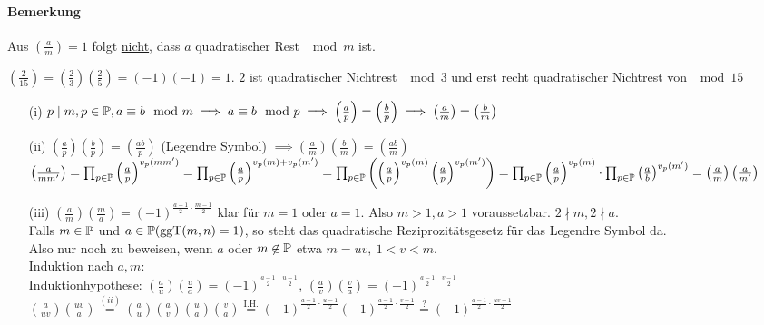 \documentclass[a4paper,twoside,DIV15,BCOR12mm]{scrbook}
\begin{document}
\paragraph{Bemerkung}
Aus $\left(\frac{a}{m}\right) = 1$ folgt \underline{nicht}, dass $a$ quadratischer Rest $\mod m$ ist.\\
\begin{beispiel}
    $\left(\frac{2}{15}\right) = \left(\frac{2}{3}\right)\left(\frac{2}{5}\right) = (-1)(-1) =
    1$.
    $2$ ist quadratischer Nichtrest $\mod 3$ und erst recht quadratischer Nichtrest von $\mod 15$
\end{beispiel}

\begin{beweis}
    \begin{itemize}
        \item[(i)] $p \mid m, p \in \mathbb{P}, a \equiv b \mod m \implies a \equiv b \mod p \implies
        \left(\frac{a}{p}\right) = \left(\frac{b}{p}\right) \implies \left(\frac{a}{m}\right) = \left(\frac{b}{m}\right)$
        \item[(ii)] $\left(\frac{a}{p}\right)\left(\frac{b}{p}\right) = \left(\frac{ab}{p}\right)$
        (Legendre Symbol) $\implies \left(\frac{a}{m}\right)\left(\frac{b}{m}\right) = \left(\frac{ab}{m}\right)$\\
            $\left(\frac{a}{mm'}\right) = \prod_{p \in \mathbb{P}}\left(\frac{a}{p}\right)^{v_p(mm')} =
            \prod_{p \in \mathbb{P}}\left(\frac{a}{p}\right)^{v_p(m) + v_p(m')} = \prod_{p \in \mathbb{P}}\left(\left(\frac{a}{p}\right)^{v_p(m)}\left(\frac{a}{p}\right)^{v_p(m')}\right)
            = \prod_{p \in \mathbb{P}}\left(\frac{a}{p}\right)^{v_p(m)} \cdot \prod_{p \in \mathbb{P}}\left(\frac{a}{b}\right)^{v_p(m')}
            = \left(\frac{a}{m}\right)\left(\frac{a}{m'}\right)$
        \item[(iii)] $\left(\frac{a}{m}\right)\left(\frac{m}{a}\right) = (-1)^{\frac{a-1}{2} \cdot \frac{m-1}{2}}$ klar für $m = 1$ oder $a = 1$. Also $m > 1, a > 1$ voraussetzbar. $2 \nmid m, 2 \nmid a$.\\
        Falls $m \in \mathbb{P}$ und $a \in \mathbb{P} (\mathop{\rm ggT}\nolimits (m, n) = 1)$, so steht das quadratische Reziprozitätsgesetz für das Legendre Symbol da.\\
        Also nur noch zu beweisen, wenn $a$ oder $m \not\in \mathbb{P}$ etwa $m = uv,\ 1 < v < m$.\\
        Induktion nach $a,m$:\\
        Induktionhypothese: $\left(\frac{a}{u}\right)\left(\frac{u}{a}\right) = (-1)^{\frac{a - 1}{2} \cdot \frac{u - 1}{2}}$, $\left(\frac{a}{v}\right)\left(\frac{v}{a}\right) = (-1)^{\frac{a - 1}{2} \cdot \frac{v - 1}{2}}$\\
        $\left(\frac{a}{uv}\right)\left(\frac{uv}{a}\right) \stackrel{(ii)}{=} \left(\frac{a}{u}\right)\left(\frac{a}{v}\right)\left(\frac{u}{a}\right)\left(\frac{v}{a}\right) \stackrel{\text{I.H.}}{=} (-1)^{\frac{a-1}{2} \cdot \frac{u - 1}{2}} (-1)^{\frac{a-1}{2} \cdot \frac{v-1}{2}} \stackrel{\text{?}}{=} (-1)^{\frac{a-1}{2} \cdot \frac{uv-1}{2}}$


\end{itemize}
\end{beweis}
\end{document}
